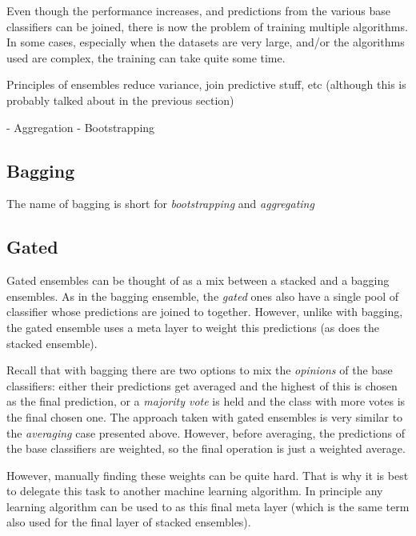 \documentclass[epsfig,a4paper,11pt,titlepage,twoside,openany]{book}
\begin{document}
Even though the performance increases, and predictions from the various base classifiers can be joined, there is now the problem of training multiple algorithms. In some cases, especially when the datasets are very large, and/or the algorithms used are complex, the training can take quite some time.



Principles of ensembles reduce variance, join predictive stuff, etc (although
this is probably talked about in the previous section)

- Aggregation - Bootstrapping
     
\subsection{Bagging}
\label{sec:ens-bagging}

The name of bagging is short for \textit{bootstrapping} and \textit{aggregating}

\cite{Breiman1996_bagging_predictors}


\subsection{Gated}
\label{sec:ens-gated}

Gated ensembles can be thought of as a mix between a stacked and a bagging ensembles. As in the bagging ensemble, the \textit{gated} ones also have a single pool of classifier whose predictions are joined to together. However, unlike with bagging, the gated ensemble uses a meta layer to weight this predictions (as does the stacked ensemble).

Recall that with bagging there are two options to mix the \textit{opinions} of the base classifiers: either their predictions get averaged and the highest of this is chosen as the final prediction, or a \textit{majority vote} is held and the class with more votes is the final chosen one. The approach taken with gated ensembles is very similar to the \textit{averaging} case presented above. However, before averaging, the predictions of the base classifiers are weighted, so the final operation is just a weighted average.

However, manually finding these weights can be quite hard. That is why it is best to delegate this task to another machine learning algorithm. In principle any learning algorithm can be used to as this final meta layer (which is the same term also used for the final layer of stacked ensembles). 
\end{document}
